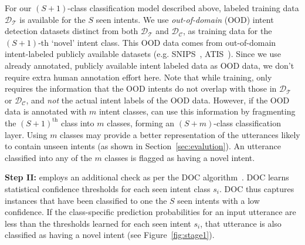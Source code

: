 For our $(S+1)$-class classification model described above, labeled training data $\mathcal{D_T}$ is available for the $S$ seen intents. We use \textit{out-of-domain} (OOD) intent detection datasets distinct from both $\mathcal{D_T}$ and $\mathcal{D_C}$, as training data for the $(S+1)$-th `novel' intent class. This OOD data comes from out-of-domain intent-labeled publicly available datasets (e.g. SNIPS~\cite{coucke2018}, ATIS~\cite{dahl1994}). Since we use already annotated, publicly available intent labeled data as OOD data, we don't require extra human annotation effort here. Note that while training, \mname{} only requires the information that the OOD intents do not overlap with those in $\mathcal{D_T}$ or $\mathcal{D_C}$, and \textit{not} the actual intent labels of the OOD data. 
However, if the OOD data is annotated with $m$ intent classes, \mname{} can use this information by fragmenting the $(S+1)^\text{th}$ class into $m$ classes, forming an $(S+m)$-class classification layer. Using $m$ classes may provide a better representation of the utterances likely to contain unseen intents (as shown in Section~\ref{sec:evalution}). An utterance classified into any of the $m$ classes is flagged as having a novel intent. 

\smallskip
\textbf{Step II:} \mname{} employs an additional check as per the DOC algorithm~\cite{shu2017doc}. DOC learns statistical confidence thresholds for each seen intent class $s_i$. DOC thus captures instances that have been classified to one the $S$ seen intents with a low confidence. 
If the class-specific prediction probabilities for an input utterance are less than the thresholds learned for each seen intent $s_i$, that utterance is also classified as having a novel intent (see Figure~\ref{fig:stage1}). 




